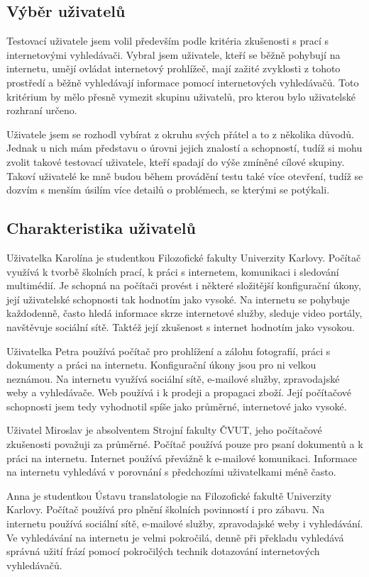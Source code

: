 \subsection{Výběr uživatelů}
Testovací uživatele jsem volil především podle kritéria zkušenosti s prací s internetovými vyhledávači. Vybral jsem uživatele, kteří se běžně pohybují na internetu, umějí ovládat internetový prohlížeč, mají zažité zvyklosti z tohoto prostředí a běžně vyhledávají informace pomocí internetových vyhledávačů. Toto kritérium by mělo přesně vymezit skupinu uživatelů, pro kterou bylo uživatelské rozhraní určeno.

Uživatele jsem se rozhodl vybírat z okruhu svých přátel a to z několika důvodů. Jednak u nich mám představu o úrovni jejich znalostí a schopností, tudíž si mohu zvolit takové testovací uživatele, kteří spadají do výše zmíněné cílové skupiny. Takoví uživatelé ke mně budou během provádění testu také více otevření, tudíž se dozvím s menším úsilím více detailů o problémech, se kterými se potýkali.

\subsection{Charakteristika uživatelů}
Uživatelka Karolína je studentkou Filozofické fakulty Univerzity Karlovy. Počítač využívá k tvorbě školních prací, k práci s internetem, komunikaci i sledování multimédií. Je schopná na počítači provést i některé složitější konfigurační úkony, její uživatelské schopnosti tak hodnotím jako vysoké. Na internetu se pohybuje každodenně, často hledá informace skrze internetové služby, sleduje video portály, navštěvuje sociální sítě. Taktéž její zkušenost s internet hodnotím jako vysokou.

Uživatelka Petra používá počítač pro prohlížení a zálohu fotografií, práci s dokumenty a práci na internetu. Konfigurační úkony jsou pro ni velkou neznámou. Na internetu využívá sociální sítě, e-mailové služby, zpravodajské weby a vyhledávače. Web používá i k prodeji a propagaci zboží. Její počítačové schopnosti jsem tedy vyhodnotil spíše jako průměrné, internetové jako vysoké.

Uživatel Miroslav je absolventem Strojní fakulty ČVUT, jeho počítačové zkušenosti považuji za průměrné. Počítač používá pouze pro psaní dokumentů a k práci na internetu. Internet používá převážně k e-mailové komunikaci. Informace na internetu vyhledává v porovnání s předchozími uživatelkami méně často.

Anna je studentkou Ústavu translatologie na Filozofické fakultě Univerzity Karlovy. Počítač používá pro plnění školních povinností i pro zábavu. Na internetu používá sociální sítě, e-mailové služby, zpravodajské weby i vyhledávání. Ve vyhledávání na internetu je velmi pokročilá, denně při překladu vyhledává správná užití frází pomocí pokročilých technik dotazování internetových vyhledávačů.

